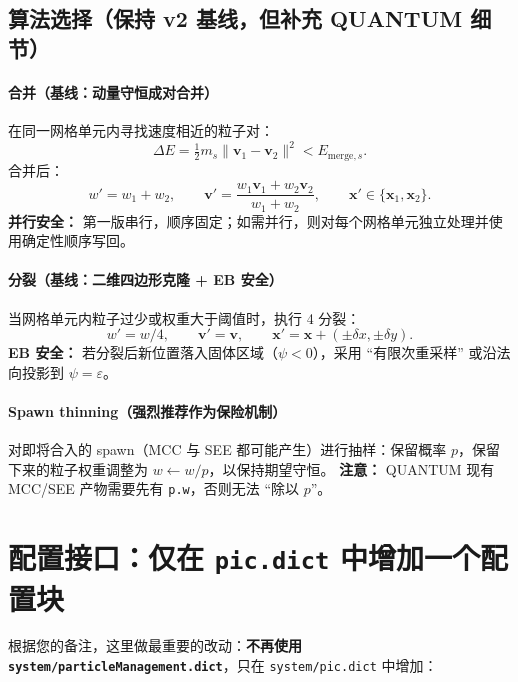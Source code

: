 \documentclass[UTF8,11pt,a4paper]{ctexart}
\begin{document}
\subsection{算法选择（保持 v2 基线，但补充 QUANTUM 细节）}
\paragraph{合并（基线：动量守恒成对合并）}
在同一网格单元内寻找速度相近的粒子对：
\[
\Delta E = \tfrac12 m_s \|\mathbf{v}_1-\mathbf{v}_2\|^2 < E_{\text{merge},s}.
\]
合并后：
\[
 w' = w_1+w_2,\qquad
 \mathbf{v}' = \frac{w_1\mathbf{v}_1+w_2\mathbf{v}_2}{w_1+w_2},\qquad
 \mathbf{x}'\in\{\mathbf{x}_1,\mathbf{x}_2\}.
\]
\textbf{并行安全：} 第一版串行，顺序固定；如需并行，则对每个网格单元独立处理并使用确定性顺序写回。

\paragraph{分裂（基线：二维四边形克隆 + EB 安全）}
当网格单元内粒子过少或权重大于阈值时，执行 4 分裂：
\[
 w' = w/4,\qquad \mathbf{v}'=\mathbf{v},\qquad \mathbf{x}'=\mathbf{x}+ (\pm \delta x,\pm \delta y).
\]
\textbf{EB 安全：} 若分裂后新位置落入固体区域（$\psi<0$），采用 ``有限次重采样'' 或沿法向投影到 $\psi=\varepsilon$。

\paragraph{Spawn thinning（强烈推荐作为保险机制）}
对即将合入的 spawn（MCC 与 SEE 都可能产生）进行抽样：保留概率 $p$，保留下来的粒子权重调整为 $w\leftarrow w/p$，以保持期望守恒。
\textbf{注意：} QUANTUM 现有 MCC/SEE 产物需要先有 \texttt{p.w}，否则无法 ``除以 $p$''。

\section{配置接口：仅在 \texttt{pic.dict} 中增加一个配置块}

根据您的备注，这里做最重要的改动：\textbf{不再使用 \texttt{system/particleManagement.dict}}，只在 \texttt{system/pic.dict} 中增加：
\end{document}
